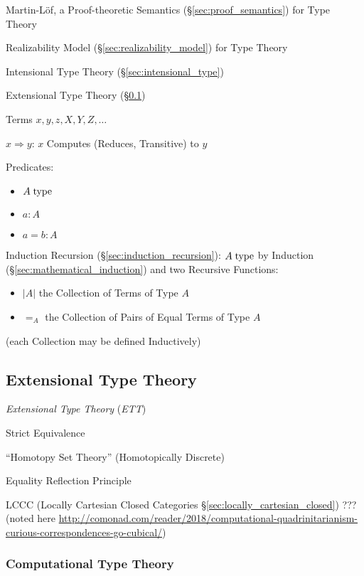 Martin-L\"of, a Proof-theoretic Semantics
(\S\ref{sec:proof_semantics}) for Type Theory

Realizability Model (\S\ref{sec:realizability_model}) for Type Theory

Intensional Type Theory (\S\ref{sec:intensional_type})

Extensional Type Theory (\S\ref{sec:extensional_type})

Terms $x,y,z,X,Y,Z,\ldots$

$x \Rightarrow y$: $x$ Computes (Reduces, Transitive) to $y$

Predicates:
\begin{itemize}
  \item $A \;\mathrm{type}$
  \item $a : A$
  \item $a = b : A$
\end{itemize}

Induction Recursion (\S\ref{sec:induction_recursion}): $A \;\mathrm{type}$ by
Induction (\S\ref{sec:mathematical_induction}) and two Recursive
Functions:
\begin{itemize}
  \item $|A|$ the Collection of Terms of Type $A$
  \item $=_A$ the Collection of Pairs of Equal Terms of Type $A$
\end{itemize}
(each Collection may be defined Inductively)



\subsection{Extensional Type Theory}\label{sec:extensional_type}
\cite{harper12}

\emph{Extensional Type Theory} (\emph{ETT})

Strict Equivalence

``Homotopy Set Theory'' (Homotopically Discrete)

Equality Reflection Principle

LCCC (Locally Cartesian Closed Categories \S\ref{sec:locally_cartesian_closed})
??? (noted here
\url{http://comonad.com/reader/2018/computational-quadrinitarianism-curious-correspondences-go-cubical/})



\subsubsection{Computational Type Theory}\label{sec:computational_type}

